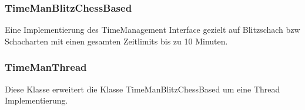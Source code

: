 \subsubsection{TimeManBlitzChessBased}
Eine Implementierung des TimeManagement Interface gezielt auf Blitzschach bzw Schacharten mit einen gesamten Zeitlimits bis zu 10 Minuten. 

\subsubsection{TimeManThread}
Diese Klasse erweitert die Klasse TimeManBlitzChessBased um eine Thread Implementierung. 
